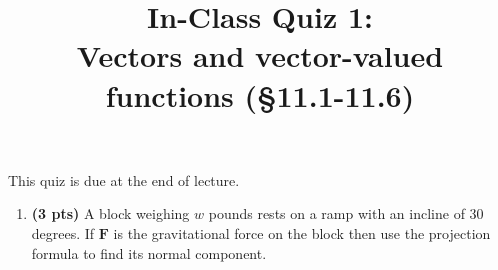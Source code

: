 \documentclass[]{article}
\title{\vspace{-3.5pc} 
	\flushleft \bf \Large In-Class Quiz 1: \\ Vectors and vector-valued functions (\S 11.1-11.6)}
\date{}
\newcommand{\vect}[1]{\mathbf{#1}}
\DeclareMathOperator{\proj}{proj}
\begin{document}
\maketitle

\vspace{-3pc}
 This quiz is due at the end of lecture.  

\noindent\hrulefill

\begin{enumerate}


%

%



%


\item %
{\bf (3 pts)} A block weighing $w$ pounds rests on a ramp with an incline of %
30 degrees. %
If $\vect F$ is the gravitational force on the block then use the projection formula to find its normal component. 


\end{enumerate}
\end{document}
